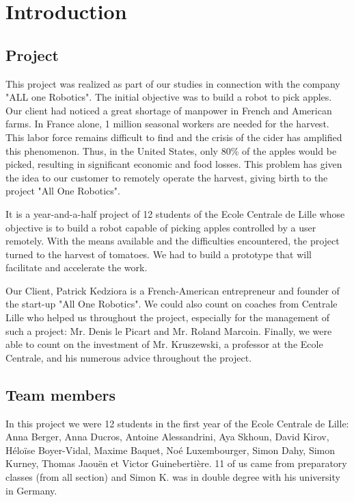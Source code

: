 \section*{Introduction}
\setcounter{figure}{0}

\subsection*{Project}

This project was realized as part of our studies in connection with the company "ALL one Robotics". The initial objective was to build a robot to pick apples. Our client had noticed a great shortage of manpower in French and American farms. In France alone, 1 million seasonal workers are needed for the harvest. This labor force remains difficult to find and the crisis of the cider has amplified this phenomenon. Thus, in the United States, only 80\% of the apples would be picked, resulting in significant economic and food losses. This problem has given the idea to our customer to remotely operate the harvest, giving birth to the project "All One Robotics". 

\bigbreak
It is a year-and-a-half project of 12 students of the Ecole Centrale de Lille whose objective is to build a robot capable of picking apples controlled by a user remotely. With the means available and the difficulties encountered, the project turned to the harvest of tomatoes. We had to build a prototype that will facilitate and accelerate the work.

\bigbreak
Our Client, Patrick Kedziora is a French-American entrepreneur and founder of the start-up "All One Robotics". We could also count on coaches from Centrale Lille who helped us throughout the project, especially for the management of such a project: Mr. Denis le Picart and Mr. Roland Marcoin. Finally, we were able to count on the investment of Mr. Kruszewski, a professor at the Ecole Centrale, and his numerous advice throughout the project.

\subsection*{Team members}

In this project we were 12 students in the first year of the Ecole Centrale de Lille: Anna Berger, Anna Ducros, Antoine Alessandrini, Aya Skhoun, David Kirov, Héloïse Boyer-Vidal, Maxime Baquet, Noé Luxembourger, Simon Dahy, Simon Kurney, Thomas Jaouën et Victor Guinebertière. 11 of us came from preparatory classes (from all section) and Simon K. was in double degree with his university in Germany. 

